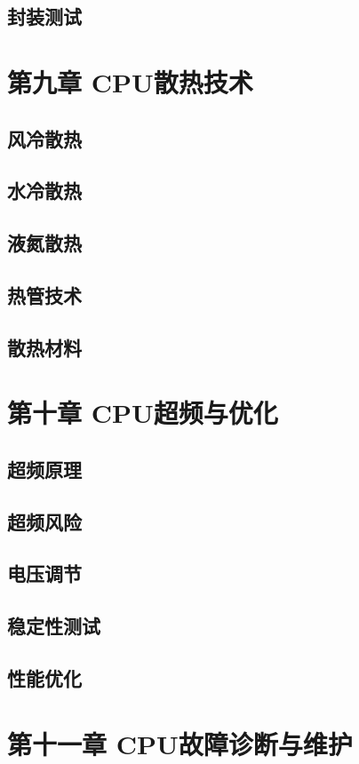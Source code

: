 \documentclass[12pt,UTF8]{ctexbook}
\begin{document}
\section{封装测试}

\chapter{第九章 CPU散热技术}

\section{风冷散热}
\section{水冷散热}
\section{液氮散热}
\section{热管技术}
\section{散热材料}

\chapter{第十章 CPU超频与优化}

\section{超频原理}
\section{超频风险}
\section{电压调节}
\section{稳定性测试}
\section{性能优化}

\chapter{第十一章 CPU故障诊断与维护}
\end{document}
